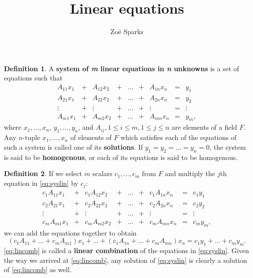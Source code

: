 \documentclass[12pt]{article}
\title{Linear equations}
\author{Zoë Sparks}
\begin{document}
\theoremstyle{definition}

\newtheorem{thm}{Theorem}
\newtheorem*{nthm}{Theorem}
\newtheorem{sthm}{}[thm]
\newtheorem{lemma}{Lemma}[thm]
\newtheorem*{cor}{Corollary}
\newtheorem*{prop}{Property}
\newtheorem*{defn}{Definition}
\newtheorem*{comm}{Comment}
\newtheorem*{exm}{Example}

\maketitle

\begin{defn}
  A \textbf{system of \textit{m} linear equations in \textit{n}
  unknowns} is a set of equations such that
  \begin{equation} \label{eq:syslin}
  \begin{array}{ccccccccc}
    A_{11}x_1 & + & A_{12}x_2 & + & \ldots & + & A_{1n}x_n & = & y_1\\
    A_{21}x_1 & + & A_{22}x_2 & + & \ldots & + & A_{2n}x_n & = & y_2\\
    \vdots    & + & \vdots    & + & \ldots & + & \vdots    & = & \vdots\\
    A_{m1}x_1 & + & A_{m2}x_2 & + & \ldots & + & A_{mn}x_n & = & y_m,
  \end{array}
  \end{equation}
  where $x_1,\ldots,x_n$, $y_1,\ldots,y_n$, and $A_{ij}, 1 \leq i
  \leq m, 1 \leq j \leq n$ are elements of a field $F$. Any
  $n$-tuple $x_1,\ldots,x_n$ of elements of $F$ which satisfies
  each of the equations of such a system is called one of its
  \textbf{solutions}. If $y_1 = y_2 = \ldots = y_n = 0$, the
  system is said to be \textbf{homogenous}, or each of its
  equations is said to be homogenous.
\end{defn}

\begin{defn}
  If we select $m$ scalars $c_1,\ldots,c_m$ from $F$ and multiply
  the $j$th equation in \eqref{eq:syslin} by $c_j$:
  \[
  \begin{array}{ccccccccc}
    c_{1}A_{11}x_1 & + & c_{1}A_{12}x_2 & + & \ldots & + & c_{1}A_{1n}x_n & = & c_{1}y_1\\
    c_{2}A_{21}x_1 & + & c_{2}A_{22}x_2 & + & \ldots & + & c_{2}A_{2n}x_n & = & c_{2}y_2\\
    \vdots    & + & \vdots    & + & \ldots & + & \vdots    & = & \vdots\\
    c_{m}A_{m1}x_1 & + & c_{m}A_{m2}x_2 & + & \ldots & + & c_{m}A_{mn}x_n & = & c_{m}y_m,
  \end{array}
  \]
  we can add the equations together to obtain
  \begin{equation} \label{eq:lincomb}
    (c_{1}A_{11} + \ldots + c_{m}A_{m1})x_1 + \ldots +
    (c_{1}A_{1n} + \ldots + c_{m}A_{mn})x_n = c_{1}y_1 + \ldots +
    c_{m}y_m.
  \end{equation}
  \eqref{eq:lincomb} is called a \textbf{linear combination} of
  the equations in \eqref{eq:syslin}. Given the way we arrived at
  \eqref{eq:lincomb}, any solution of \eqref{eq:syslin} is
  clearly a solution of \eqref{eq:lincomb} as well.
\end{defn}
\end{document}
